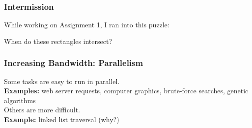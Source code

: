 \begin{frame}
  \frametitle{Intermission}

  While working on Assignment 1, I ran into this puzzle:

  \vspace*{1cm}\hspace*{1cm}

  When do these rectangles intersect?
\end{frame}


\begin{frame}
  \frametitle{Increasing Bandwidth: Parallelism}

\hspace*{.2\textwidth}\begin{minipage}{.76\textwidth}
   Some tasks are easy to run in parallel. \\[1em]
   {\bf \hspace*{3em} Examples:} web server requests, computer graphics, brute-force searches,  genetic
          algorithms\\[2em]
 Others are more difficult.\\[1em]
    {\bf \hspace*{3em} Example:} linked list traversal (why?)
\end{minipage}

\end{frame}

